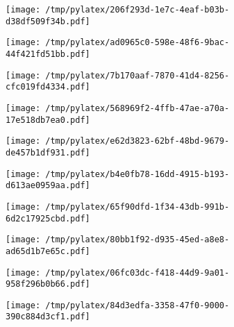 \documentclass{article}
\begin{document}
\begin{figure}[htbp]
\begin{subfigure}[b]{.3\linewidth}
\texttt{[image: /tmp/pylatex/206f293d-1e7c-4eaf-b03b-d38df509f34b.pdf]}
\end{subfigure}
\begin{subfigure}[b]{.3\linewidth}
\texttt{[image: /tmp/pylatex/ad0965c0-598e-48f6-9bac-44f421fd51bb.pdf]}
\end{subfigure}
\begin{subfigure}[b]{.3\linewidth}
\texttt{[image: /tmp/pylatex/7b170aaf-7870-41d4-8256-cfc019fd4334.pdf]}
\end{subfigure}
\begin{subfigure}[b]{.3\linewidth}
\texttt{[image: /tmp/pylatex/568969f2-4ffb-47ae-a70a-17e518db7ea0.pdf]}
\end{subfigure}
\begin{subfigure}[b]{.3\linewidth}
\texttt{[image: /tmp/pylatex/e62d3823-62bf-48bd-9679-de457b1df931.pdf]}
\end{subfigure}
\begin{subfigure}[b]{.3\linewidth}
\texttt{[image: /tmp/pylatex/b4e0fb78-16dd-4915-b193-d613ae0959aa.pdf]}
\end{subfigure}
\begin{subfigure}[b]{.3\linewidth}
\texttt{[image: /tmp/pylatex/65f90dfd-1f34-43db-991b-6d2c17925cbd.pdf]}
\end{subfigure}
\begin{subfigure}[b]{.3\linewidth}
\texttt{[image: /tmp/pylatex/80bb1f92-d935-45ed-a8e8-ad65d1b7e65c.pdf]}
\end{subfigure}
\begin{subfigure}[b]{.3\linewidth}
\texttt{[image: /tmp/pylatex/06fc03dc-f418-44d9-9a01-958f296b0b66.pdf]}
\end{subfigure}
\begin{subfigure}[b]{.3\linewidth}
\texttt{[image: /tmp/pylatex/84d3edfa-3358-47f0-9000-390c884d3cf1.pdf]}
\end{subfigure}
\end{figure}
\end{document}
